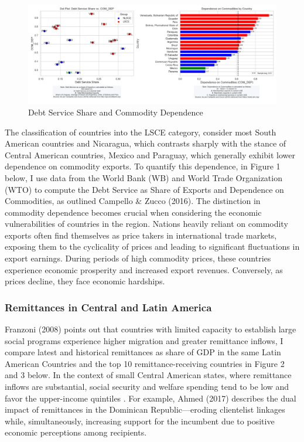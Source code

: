 \documentclass[
]{article}
\begin{document}
\begin{figure}
\hypertarget{fig:label}{%
\centering
\includegraphics[width=1\textwidth,height=1\textheight]{com_debt_latam.png}
\caption{Debt Service Share and Commodity Dependence}\label{fig:label}
}
\end{figure}

The classification of countries into the LSCE category, consider most
South American countries and Nicaragua, which contrasts sharply with the
stance of Central American countries, Mexico and Paraguay, which
generally exhibit lower dependence on commodity exports. To quantify
this dependence, in Figure 1 below, I use data from the World Bank (WB)
and World Trade Organization (WTO) to compute the Debt Service as Share
of Exports and Dependence on Commodities, as outlined Campello \& Zucco
(2016). The distinction in commodity dependence becomes crucial when
considering the economic vulnerabilities of countries in the region.
Nations heavily reliant on commodity exports often find themselves as
price takers in international trade markets, exposing them to the
cyclicality of prices and leading to significant fluctuations in export
earnings. During periods of high commodity prices, these countries
experience economic prosperity and increased export revenues.
Conversely, as prices decline, they face economic hardships.

\hypertarget{remittances-in-central-and-latin-america}{%
\subsubsection{Remittances in Central and Latin
America}\label{remittances-in-central-and-latin-america}}

Franzoni (2008) points out that countries with limited capacity to
establish large social programs experience higher migration and greater
remittance inflows, I compare latest and historical remittances as share
of GDP in the same Latin American Countries and the top 10
remittance-receiving countries in Figure 2 and 3 below. In the context
of small Central American states, where remittance inflows are
substantial, social security and welfare spending tend to be low and
favor the upper-income quintiles . For example, Ahmed (2017) describes
the dual impact of remittances in the Dominican Republic---eroding
clientelist linkages while, simultaneously, increasing support for the
incumbent due to positive economic perceptions among recipients.
\end{document}
